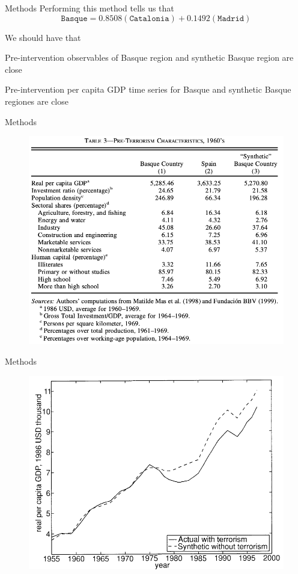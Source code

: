 \documentclass[notes,11pt, aspectratio=169]{beamer}
\newenvironment{wideitemize}{\itemize\addtolength{\itemsep}{10pt}}{\enditemize}
\begin{document}
\begin{frame}{Methods}
    Performing this method tells us that 
    \[\texttt{Basque} = 0.8508(\texttt{Catalonia}) + 0.1492 (\texttt{Madrid})\]

    We should have that \medskip 
    \begin{wideitemize}
        \item Pre-intervention observables of Basque region and synthetic Basque region are close 
        \item Pre-intervention per capita GDP time series for Basque and synthetic Basque regiones are close
    \end{wideitemize}
\end{frame}


\begin{frame}{Methods}
    \begin{figure}
        \centering
        \includegraphics[width = .6\textwidth]{figures/balance panel all.png}
        \label{fig:my_label}
    \end{figure}
\end{frame}

\begin{frame}{Methods}
    \begin{figure}
        \centering
        \includegraphics[width = .6\textwidth]{figures/ts.png}
        \label{fig:my_label}
    \end{figure}
\end{frame}
\end{document}
